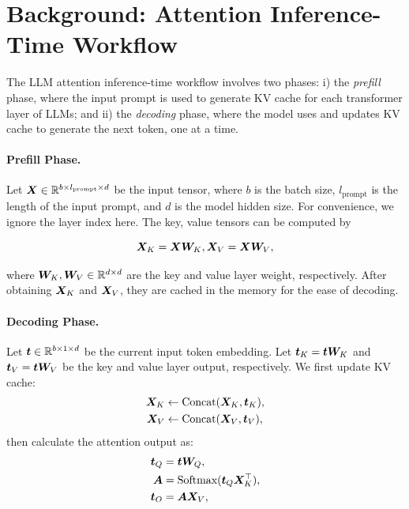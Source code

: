 \section{Background: Attention Inference-Time Workflow}
\label{sec: background}

The LLM attention inference-time workflow involves two phases: i) the \textit{prefill} phase, where the input prompt is used to generate KV cache for each transformer layer of LLMs; and ii) the \textit{decoding} phase, where the model uses and updates KV cache to generate the next token, one at a time. 

\paragraph{Prefill Phase.} Let ${\bm{X}} \in \mathbb{R}^{b\times l_{\text{prompt}} \times d}$ be the input tensor, where $b$ is the batch size, $l_{\text{prompt}}$ is the length of the input prompt, and $d$ is the model hidden size.  
For convenience, we ignore the layer index here. 
The key, value tensors can be computed by

\vspace{-2em}
\begin{equation}
    {\bm{X}}_K= {\bm{X}} {\bm{W}}_K, {\bm{X}}_V = {\bm{X}} {\bm{W}}_V, \nonumber
\end{equation}
\vspace{-2em}

where ${\bm{W}}_K, {\bm{W}}_V\in\mathbb{R}^{d\times d}$ are the key and value layer weight, respectively.  After obtaining ${\bm{X}}_K$ and ${\bm{X}}_V$, they are cached in the memory for the ease of decoding.

\paragraph{Decoding Phase.} Let ${\bm{t}} \in \mathbb{R}^{b\times 1 \times d}$ be the current input token embedding. 
Let ${\bm{t}}_K={\bm{t}} {\bm{W}}_K$ and ${\bm{t}}_V={\bm{t}} {\bm{W}}_V$ be the key and value layer output, respectively.
We first update KV cache:
\vspace{-1em}
\begin{align}
    {\bm{X}}_K &\leftarrow \text{Concat} ({\bm{X}}_K, {\bm{t}}_K), \nonumber \\
    {\bm{X}}_V &\leftarrow \text{Concat} ({\bm{X}}_V,  {\bm{t}}_V ) \nonumber,     
\end{align}
then calculate the attention output as:
\begin{align}
 {\bm{t}}_Q &= {\bm{t}} {\bm{W}}_Q,   \nonumber \\
  {\bm{A}} &= \text{Softmax} ({\bm{t}}_Q {\bm{X}}^{\top}_K),  \nonumber \\
 {\bm{t}}_O &= {\bm{A}}{\bm{X}}_V,
 \label{eq: av}
\end{align}
\vspace{-2em}

